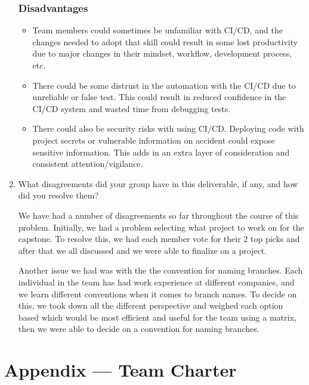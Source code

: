 \documentclass{article}
\begin{document}
\begin{enumerate}
\subsubsection*{Disadvantages}
\begin{itemize}
  \item Team members could sometimes be unfamiliar with CI/CD, and the changes needed to 
  adopt that skill could result in some lost productivity due to major changes in their
  mindset, workflow, development process, etc.
  \item There could be some distrust in the automation with the CI/CD due to unreliable
  or false test. This could result in reduced confidence in the CI/CD system and wasted time
  from debugging tests.
  \item There could also be security risks with using CI/CD. Deploying code with 
  project secrets or vulnerable information on accident could expose sensitive information.
  This adds in an extra layer of consideration and consistent attention/vigilance.
\end{itemize}
\item What disagreements did your group have in this deliverable, if any,
    and how did you resolve them?

	We have had a number of disagreements so far throughout the course of this problem. Initially, we had a problem selecting what project to work on for the capstone. To resolve this, we had each member vote for their 2 top picks and after that we all discussed and we were able to finalize on a project.
	
  Another issue we had was with the the convention for naming branches. Each individual in the team has had work experience at different companies, and we learn different conventions when it comes to branch names. To decide on this, we took down all the different perspective and weighed each option based which would be most efficient and useful for the team using a matrix, then we were able to decide on a convention for naming branches.
\end{enumerate}

\newpage{}

\section*{Appendix --- Team Charter}
\end{document}
